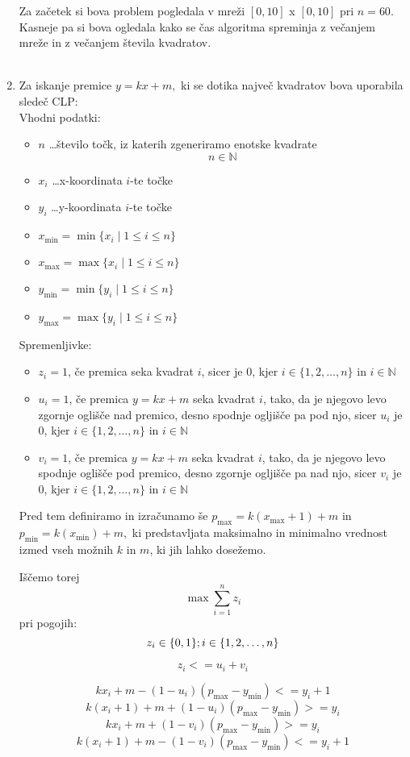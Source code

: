 \documentclass[a4, 12pt]{article}
\begin{document}
\begin{enumerate}
Za začetek si bova problem pogledala v mreži $[0,10]$ x $[0,10]$ pri $n = 60$. Kasneje pa si bova ogledala kako se čas 
algoritma spreminja z večanjem mreže in z večanjem števila kvadratov.\\
 \\
\item Za iskanje premice $y = kx + m,$ ki se dotika največ kvadratov bova uporabila sledeč CLP:\\
Vhodni podatki:
\begin{itemize}
\item{$n$ \dots število točk, iz katerih zgeneriramo enotske kvadrate} $$n \in \mathbb{N}$$
\item{$x_{i}$ \dots x-koordinata $i$-te točke}
\item{$y_{i}$ \dots y-koordinata $i$-te točke}
\item{$x_{\min} = \min \{x_i \mid 1 \le i \le n\}$}
\item{$x_{\max} = \max \{x_i \mid 1 \le i \le n\}$}
\item{$y_{\min} = \min \{y_i \mid 1 \le i \le n\}$}
\item{$y_{\max} = \max \{y_i \mid 1 \le i \le n\}$}
\end{itemize}
Spremenljivke:
\begin{itemize}
\item{$z_{i}= 1$, če premica seka kvadrat $i$}, sicer je $0$, kjer $i \in \{1, 2, \dots, n\}$ in $i \in \mathbb{N}$
\item{$u_{i}= 1$, če premica $y = kx + m$ seka kvadrat $i$}, tako, da je njegovo levo zgornje oglišče nad premico, desno spodnje ogljišče pa pod njo, sicer $u_i$ je $0$, kjer $i \in \{1, 2, \dots, n\}$ in $i \in \mathbb{N}$
\item{$v_{i}= 1$, če premica $y = kx + m$ seka kvadrat $i$},  tako, da je njegovo levo spodnje oglišče pod premico, desno zgornje ogljišče pa nad njo, sicer $v_i$ je $0$, kjer $i \in \{1, 2, \dots, n\}$ in $i \in \mathbb{N}$
\end{itemize}
Pred tem definiramo in izračunamo še $p_{\max} = k (x_{\max}+1)+m$ in $p_{\min} = k (x_{\min})+m,$ ki predstavljata maksimalno in 
minimalno vrednost izmed vseh možnih $k$ in $m$, ki jih lahko dosežemo. 

Iščemo torej \\
$$\max\sum_{i=1}^n z_{i} $$
pri pogojih:\\
$$z_{i} \in \{0,1\}; i \in \{1, 2, \dots, n\}\\$$

$$z_i <= u_i + v_i$$    %

$$k x_i + m - (1 - u_i) (p_{\max} - y_{\min}) <= y_i + 1$$
$$k (x_i+1) + m + (1 - u_i) (p_{\max} - y_{\min}) >= y_i $$
$$k x_i + m + (1 - v_i) (p_{\max} - y_{\min}) >= y_i$$
$$k (x_i+1) + m - (1 - v_i) (p_{\max} - y_{\min}) <= y_i + 1$$
\end{enumerate}
\end{document}

